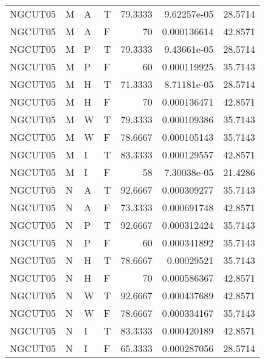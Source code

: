 \begin{tabular}{llllrrr}
    NGCUT05  & M     & A     & T          & 79.3333    & 9.62257e-05 & 28.5714  \\
    NGCUT05  & M     & A     & F          & 70         & 0.000136614 & 42.8571  \\
    NGCUT05  & M     & P     & T          & 79.3333    & 9.43661e-05 & 28.5714  \\
    NGCUT05  & M     & P     & F          & 60         & 0.000119925 & 35.7143  \\
    NGCUT05  & M     & H     & T          & 71.3333    & 8.71181e-05 & 28.5714  \\
    NGCUT05  & M     & H     & F          & 70         & 0.000136471 & 42.8571  \\
    NGCUT05  & M     & W     & T          & 79.3333    & 0.000109386 & 35.7143  \\
    NGCUT05  & M     & W     & F          & 78.6667    & 0.000105143 & 35.7143  \\
    NGCUT05  & M     & I     & T          & 83.3333    & 0.000129557 & 42.8571  \\
    NGCUT05  & M     & I     & F          & 58         & 7.30038e-05 & 21.4286  \\
    NGCUT05  & N     & A     & T          & 92.6667    & 0.000309277 & 35.7143  \\
    NGCUT05  & N     & A     & F          & 73.3333    & 0.000691748 & 42.8571  \\
    NGCUT05  & N     & P     & T          & 92.6667    & 0.000312424 & 35.7143  \\
    NGCUT05  & N     & P     & F          & 60         & 0.000341892 & 35.7143  \\
    NGCUT05  & N     & H     & T          & 78.6667    & 0.00029521  & 35.7143  \\
    NGCUT05  & N     & H     & F          & 70         & 0.000586367 & 42.8571  \\
    NGCUT05  & N     & W     & T          & 92.6667    & 0.000437689 & 42.8571  \\
    NGCUT05  & N     & W     & F          & 78.6667    & 0.000334167 & 35.7143  \\
    NGCUT05  & N     & I     & T          & 83.3333    & 0.000420189 & 42.8571  \\
    NGCUT05  & N     & I     & F          & 65.3333    & 0.000287056 & 28.5714  \\
    \hline
\end{tabular}